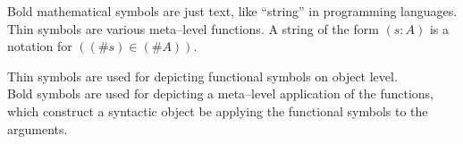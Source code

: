 \begin{metanotation}
Bold mathematical symbols are just text, like ``string'' in programming languages. Thin symbols are various meta--level functions.
A string of the form $(s:A)$ is a notation for 
$((\#s) \in (\#A))$.%
\end{metanotation}
\begin{metanotation}
Thin symbols are used for depicting functional symbols on object level.\\
Bold symbols are used for depicting a meta--level application of the functions, which construct a syntactic object be applying the functional symbols to the arguments.
\end{metanotation}
\pagebreak
\fi %
